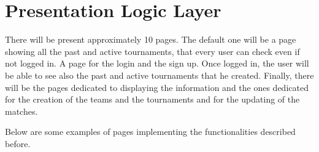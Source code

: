 \section{Presentation Logic Layer}

There will be present approximately 10 pages. The default one will be a page showing all the past and active tournaments, that every user can check even if not logged in. A page for the login and the sign up. Once logged in, the user will be able to see also the past and active tournaments that he created. Finally, there will be the pages dedicated to displaying the information and the ones dedicated for the creation of the teams and the tournaments and for the updating of the matches.

Below are some examples of pages implementing the functionalities described before.

